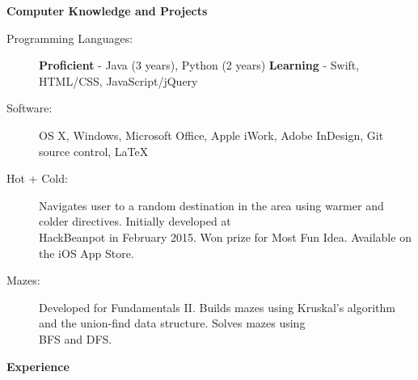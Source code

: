 \documentclass[letterpaper,10.6pt]{article}
\newcommand{\resheading}[1]{{\large \colorbox{mygrey}{\begin{minipage}{\textwidth}{\textbf{#1 \vphantom{p\^{E}}}}\end{minipage}}}}
\begin{document}
\resheading{Computer Knowledge and Projects}
{\small
\begin{description}
	\item[Programming Languages:] {\footnotesize \textbf{Proficient} - Java (3 years), Python (2 years) \enspace \textbf{Learning} - Swift, HTML/CSS, JavaScript/jQuery}
	\item[Software:] {\footnotesize OS X, Windows, Microsoft Office, Apple iWork, Adobe InDesign, Git source control, \LaTeX}
	\item[Hot + Cold:] {\footnotesize Navigates user to a random destination in the area using warmer and colder directives. Initially developed at \\ \hspace{1.31cm}HackBeanpot in February 2015. Won prize for Most Fun Idea. Available on the iOS App Store.}
	\item[Mazes:] {\footnotesize Developed for Fundamentals II. Builds mazes using Kruskal's algorithm and the union-find data structure. Solves mazes using \\ \hspace{0.41cm}BFS and DFS.}
	
\end{description}
}
\resheading{Experience}
\end{document}
